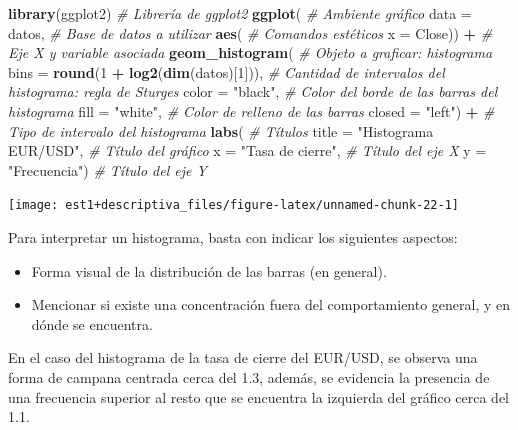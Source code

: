 \documentclass[
  11pt,
]{book}
\newenvironment{Shaded}{\begin{snugshade}}{\end{snugshade}}
\newcommand{\AttributeTok}[1]{\textcolor[rgb]{0.13,0.29,0.53}{#1}}
\newcommand{\CommentTok}[1]{\textcolor[rgb]{0.56,0.35,0.01}{\textit{#1}}}
\newcommand{\DecValTok}[1]{\textcolor[rgb]{0.00,0.00,0.81}{#1}}
\newcommand{\FunctionTok}[1]{\textcolor[rgb]{0.13,0.29,0.53}{\textbf{#1}}}
\newcommand{\NormalTok}[1]{#1}
\newcommand{\SpecialCharTok}[1]{\textcolor[rgb]{0.81,0.36,0.00}{\textbf{#1}}}
\newcommand{\StringTok}[1]{\textcolor[rgb]{0.31,0.60,0.02}{#1}}
\providecommand{\tightlist}{%
  \setlength{\itemsep}{0pt}\setlength{\parskip}{0pt}}
\theoremstyle{definition}
\theoremstyle{definition}
\theoremstyle{definition}
\theoremstyle{definition}
\theoremstyle{remark}
\begin{document}
\begin{Shaded}
\begin{Highlighting}[]
\FunctionTok{library}\NormalTok{(ggplot2) }\CommentTok{\# Librería de ggplot2}
\FunctionTok{ggplot}\NormalTok{( }\CommentTok{\# Ambiente gráfico}
  \AttributeTok{data =}\NormalTok{ datos, }\CommentTok{\# Base de datos a utilizar}
       \FunctionTok{aes}\NormalTok{( }\CommentTok{\# Comandos estéticos}
         \AttributeTok{x =}\NormalTok{ Close)) }\SpecialCharTok{+} \CommentTok{\# Eje X y variable asociada }
  \FunctionTok{geom\_histogram}\NormalTok{( }\CommentTok{\# Objeto a graficar: histograma}
    \AttributeTok{bins =} \FunctionTok{round}\NormalTok{(}\DecValTok{1} \SpecialCharTok{+} \FunctionTok{log2}\NormalTok{(}\FunctionTok{dim}\NormalTok{(datos)[}\DecValTok{1}\NormalTok{])), }\CommentTok{\# Cantidad de intervalos del histograma: regla de Sturges}
    \AttributeTok{color =} \StringTok{"black"}\NormalTok{, }\CommentTok{\# Color del borde de las barras del histograma}
    \AttributeTok{fill =} \StringTok{"white"}\NormalTok{, }\CommentTok{\# Color de relleno de las barras}
    \AttributeTok{closed =} \StringTok{"left"}\NormalTok{) }\SpecialCharTok{+} \CommentTok{\# Tipo de intervalo del histograma}
  \FunctionTok{labs}\NormalTok{( }\CommentTok{\# Títulos}
    \AttributeTok{title =} \StringTok{"Histograma EUR/USD"}\NormalTok{, }\CommentTok{\# Título del gráfico}
    \AttributeTok{x =} \StringTok{"Tasa de cierre"}\NormalTok{, }\CommentTok{\# Título del eje X}
    \AttributeTok{y =} \StringTok{"Frecuencia"}\NormalTok{) }\CommentTok{\# Título del eje Y}
\end{Highlighting}
\end{Shaded}

\begin{center}\texttt{[image: est1+descriptiva\_files/figure-latex/unnamed-chunk-22-1]} \end{center}

Para interpretar un histograma, basta con indicar los siguientes aspectos:

\begin{itemize}
\tightlist
\item
  Forma visual de la distribución de las barras (en general).
\item
  Mencionar si existe una concentración fuera del comportamiento general, y en dónde se encuentra.
\end{itemize}

En el caso del histograma de la tasa de cierre del EUR/USD, se observa una forma de campana centrada cerca del 1.3, además, se evidencia la presencia de una frecuencia superior al resto que se encuentra la izquierda del gráfico cerca del 1.1.
\end{document}
